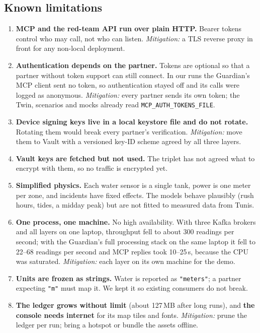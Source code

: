 \documentclass[10pt,a4paper]{article}
\begin{document}
\subsection{Known limitations}
\begin{enumerate}[leftmargin=*,itemsep=0pt,topsep=1pt]
  \item \textbf{MCP and the red-team API run over plain HTTP.} Bearer tokens control who may call, not who can listen. \textit{Mitigation:} a TLS reverse proxy in front for any non-local deployment.
  \item \textbf{Authentication depends on the partner.} Tokens are optional so that a partner without token support can still connect. In our runs the Guardian's MCP client sent no token, so authentication stayed off and its calls were logged as anonymous. \textit{Mitigation:} every partner sends its own token; the Twin, scenarios and mocks already read \texttt{MCP\_AUTH\_TOKENS\_FILE}.
  \item \textbf{Device signing keys live in a local keystore file and do not rotate.} Rotating them would break every partner's verification. \textit{Mitigation:} move them to Vault with a versioned key-ID scheme agreed by all three layers.
  \item \textbf{Vault keys are fetched but not used.} The triplet has not agreed what to encrypt with them, so no traffic is encrypted yet.
  \item \textbf{Simplified physics.} Each water sensor is a single tank, power is one meter per zone, and incidents have fixed effects. The models behave plausibly (rush hours, tides, a midday peak) but are not fitted to measured data from Tunis.
  \item \textbf{One process, one machine.} No high availability. With three Kafka brokers and all layers on one laptop, throughput fell to about 300 readings per second; with the Guardian's full processing stack on the same laptop it fell to 22--68 readings per second and MCP replies took 10--25\,s, because the CPU was saturated. \textit{Mitigation:} each layer on its own machine for the demo.
  \item \textbf{Units are frozen as strings.} Water is reported as \texttt{"meters"}; a partner expecting \texttt{"m"} must map it. We kept it so existing consumers do not break.
  \item \textbf{The ledger grows without limit} (about 127\,MB after long runs), and \textbf{the console needs internet} for its map tiles and fonts. \textit{Mitigation:} prune the ledger per run; bring a hotspot or bundle the assets offline.
\end{enumerate}
\end{document}
